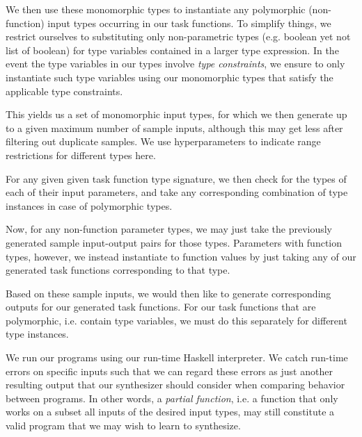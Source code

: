 \documentclass{article} %
\begin{document}
We then use these monomorphic types to instantiate any polymorphic
(non-function) input types occurring in our task functions.
To simplify things, we restrict ourselves to substituting only non-parametric types (e.g. boolean yet not list of boolean) for type variables contained in a larger type expression.
In the event the type variables in our types involve \emph{type constraints},
we ensure to only instantiate such type variables using our monomorphic types that satisfy the applicable type constraints.

This yields us a set of monomorphic input types,
for which we then generate up to a given maximum number of sample inputs,
although this may get less after filtering out duplicate samples.
We use hyperparameters to indicate range restrictions for different types here.

For any given given task function type signature,
we then check for the types of each of their input parameters,
and take any corresponding combination of type instances in case of polymorphic types.

Now, for any non-function parameter types,
we may just take the previously generated sample input-output pairs for those types.
Parameters with function types, however,
we instead instantiate to function values by just taking
any of our generated task functions corresponding to that type.

Based on these sample inputs, we would then like to generate corresponding outputs for our generated task functions.
For our task functions that are polymorphic, i.e. contain type variables,
we must do this separately for different type instances.


We run our programs using our run-time Haskell interpreter.
We catch run-time errors on specific inputs such that
we can regard these errors as just another resulting output
that our synthesizer should consider when comparing behavior between programs.
In other words, a \emph{partial function},
i.e. a function that only works on a subset all inputs of the desired input types,
may still constitute a valid program that we may wish to learn to synthesize.
\end{document}
